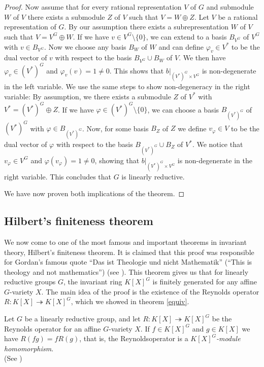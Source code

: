 \begin{proof}
  Now assume that for every rational representation $V$ of $G$ and submodule $W$ of $V$ there exists a submodule $Z$ of $V$ such that $V = W \oplus Z$.
  Let $V$ be a rational representation of $G$.
  By our assumption there exists a subrepresentation $W$ of $V$ such that $V = V^G \oplus W$.
  If we have $v \in V^G \setminus \{0\}$, we can extend to a basis $B_{V^G}$ of $V^G$ with $v \in B_{V^G}$.
  Now we choose any basis $B_W$ of $W$ and can define $\varphi_v \in V^\ast$ to be the dual vector of $v$ with respect to the basis $B_{V^G} \cup B_W$ of $V$.
  We then have $\varphi_v \in (V^\ast)^G $ and $\varphi_v (v) = 1 \neq 0$.
  This shows that $\left. b\right|_{(V^\ast)^G \times V^G}$ is non-degenerate in the left variable.
  We use the same steps to show non-degeneracy in the right variable:
  By assumption, we there exists a submodule $Z$ of $V^\ast$ with $V^\ast = (V^\ast)^G \oplus Z$.
  If we have $\varphi \in (V^\ast)^G \setminus\{0\}$, we can choose a basis $B_{(V^\ast)^G}$ of $(V^\ast)^G$ with $\varphi \in B_{(V^\ast)^G}$.
  Now, for some basis $B_Z$ of $Z$ we define $v_\varphi \in V$ to be the dual vector of $\varphi$ with respect to the basis $B_{(V^\ast)^G}\cup B_Z$ of $V^\ast$.
  We notice that $v_\varphi \in V^G$ and $\varphi(v_\varphi) = 1 \neq 0$, showing that $\left. b\right|_{(V^\ast)^G \times V^G}$ is non-degenerate in the right variable.
  This concludes that $G$ is linearly reductive.
  
  We have now proven both implications of the theorem.
\end{proof}

\subsection{Hilbert's finiteness theorem}

We now come to one of the most famous and important theorems in invariant theory, Hilbert's finiteness theorem.
It is claimed that this proof was responsible for Gordan's famous quote ``Das ist Theologie und nicht Mathematik'' (``This is theology and not mathematics'') (see \cite[p.42]{DK15}).
This theorem gives us that for linearly reductive groups $G$, the invariant ring $K[X]^G$ is finitely generated for any affine $G$-variety $X$.
The main idea of the proof is the existence of the Reynolds operator $R \colon K[X] \twoheadrightarrow K[X]^G$, which we showed in theorem \ref{equiv}. 

\begin{proposition}
  Let $G$ be a linearly reductive group, and let \linebreak$ R \colon K[X] \twoheadrightarrow K[X]^G $ be the Reynolds operator for an affine $G$-variety $X$.
  If $f \in K[X]^G$ and $g \in K[X]$ we have $R(fg) = fR(g)$, that is, the Reynolds\linebreak operator is a \textit{$K[X]^G$-module homomorphism}.  \\
  (See \cite[2.2.7]{DK15})
\end{proposition}

